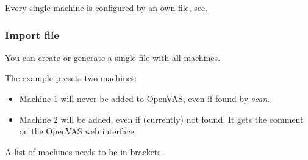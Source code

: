Every single machine is configured by an own file, see.


\breakpoint\subsubsection*{Import file}\label{sec:singlefileimport}
You can create or generate a single file with all machines.

The example  presets two machines:
\begin{itemize}
\item Machine 1 will never be added to OpenVAS, even if found by \emph{scan}.
\item Machine 2 will be added, even if (currently) not found. It gets the comment on the OpenVAS web interface.
\end{itemize}



\warn A list of machines needs to be in brackets.
